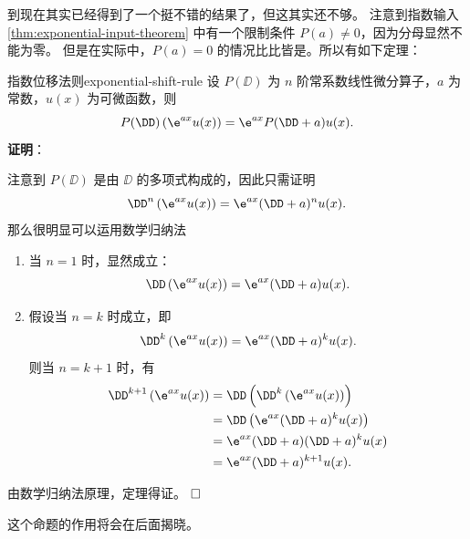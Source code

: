 到现在其实已经得到了一个挺不错的结果了，但这其实还不够。
注意到指数输入 \cref{thm:exponential-input-theorem} 中有一个限制条件 $ P(a) \neq 0 $，因为分母显然不能为零。
但是在实际中，$ P(a) = 0 $ 的情况比比皆是。所以有如下定理：
\begin{theorem}{指数位移法则}{exponential-shift-rule}
    设 $ P(\DD) $ 为 $ n $ 阶常系数线性微分算子，$ a $ 为常数，$ u(x) $ 为可微函数，则
    \begin{equation}
        P(\DD) \left( \e^{ax} u(x) \right) = \e^{ax} P(\DD + a) u(x) .
    \end{equation}
    \textbf{证明}：

    注意到 $ P(\DD) $ 是由 $ \DD $ 的多项式构成的，因此只需证明
    \begin{equation*}
        \DD^n \left( \e^{ax} u(x) \right) = \e^{ax} (\DD + a)^n u(x) .
    \end{equation*}
    那么很明显可以运用数学归纳法
    \begin{enumerate}
        \item 当 $ n = 1 $ 时，显然成立：
              \begin{equation*}
                  \DD \left( \e^{ax} u(x) \right) = \e^{ax} (\DD + a) u(x) .
              \end{equation*}
        \item 假设当 $ n = k $ 时成立，即
              \begin{equation*}
                  \DD^k \left( \e^{ax} u(x) \right) = \e^{ax} (\DD + a)^k u(x) .
              \end{equation*}
              则当 $ n = k + 1 $ 时，有
              \begin{equation*}
                  \begin{aligned}
                      \DD^{k+1} \left( \e^{ax} u(x) \right) & = \DD \left( \DD^k \left( \e^{ax} u(x) \right) \right) \\
                                                            & = \DD \left( \e^{ax} (\DD + a)^k u(x) \right)          \\
                                                            & = \e^{ax} (\DD + a) (\DD + a)^k u(x)                   \\
                                                            & = \e^{ax} (\DD + a)^{k+1} u(x) .
                  \end{aligned}
              \end{equation*}
    \end{enumerate}
    由数学归纳法原理，定理得证。
    $\hfill\square$
\end{theorem}
这个命题的作用将会在后面揭晓。

